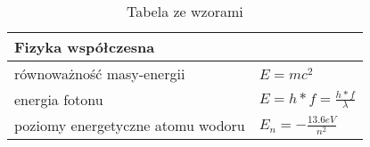 \begin{table}[!h]
\def\arraystretch{2}
\centering
\begin{tabular}{|ll|}
\hline
\multicolumn{2}{|l|}{\textbf{Fizyka współczesna}}            \\ \hline
\multicolumn{1}{|l|}{równoważność masy-energii}         & $E=mc^2$  \\ \hline
\multicolumn{1}{|l|}{energia fotonu}                    & $E=h*f=\frac{h*f}{\lambda}$ \\ \hline
\multicolumn{1}{|l|}{poziomy energetyczne atomu wodoru} & $E_n=-\frac{13.6 eV}{n^2}$ \\ \hline
\end{tabular}

\caption{Tabela ze wzorami}
\label{table}
\end{table}